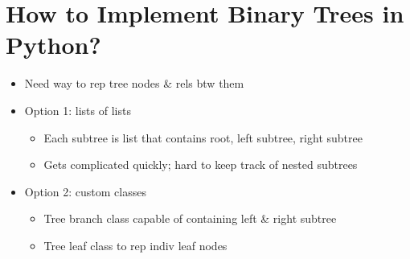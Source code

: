 \documentclass{article}
\begin{document}
\section{How to Implement Binary Trees in Python?}
    \begin{multicols}{2}
        \begin{itemize}
            \item Need way to rep tree nodes \& rels btw them
            \item Option 1: lists of lists
                \begin{itemize}
                    \item Each subtree is list that contains root, left subtree, right subtree
                    \item Gets complicated quickly; hard to keep track of nested subtrees
                \end{itemize}
            \item Option 2: custom classes
                \begin{itemize}
                    \item Tree branch class capable of containing left \& right subtree
                    \item Tree leaf class to rep indiv leaf nodes
                \end{itemize}
        \end{itemize}
    \end{multicols}
\end{document}
